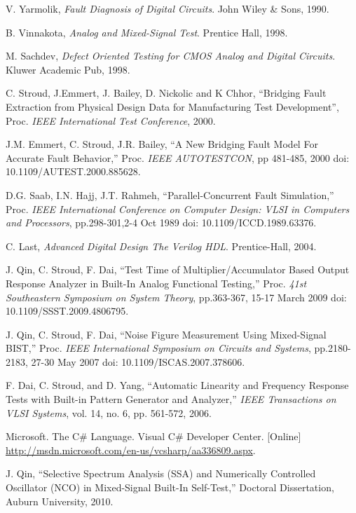 \documentclass[12pt]{report}
\begin{document}
\begin{thebibliography}{99}
 V. Yarmolik, \textit{Fault Diagnosis of Digital Circuits}. John Wiley & Sons, 1990.

 B. Vinnakota, \textit{Analog and Mixed-Signal Test}. Prentice Hall, 1998.

 M. Sachdev, \textit{Defect Oriented Testing for CMOS Analog and Digital Circuits}.  Kluwer Academic Pub, 1998.

 C. Stroud, J.Emmert, J. Bailey, D. Nickolic and K Chhor, ``Bridging Fault Extraction from Physical Design Data for Manufacturing Test Development'', Proc. \textit{IEEE International Test Conference}, 2000.

 J.M. Emmert, C. Stroud, J.R. Bailey, ``A New Bridging Fault Model For Accurate Fault Behavior,'' Proc. \textit{IEEE AUTOTESTCON}, pp 481-485, 2000 doi: 10.1109/AUTEST.2000.885628.

 D.G. Saab, I.N. Hajj, J.T. Rahmeh, ``Parallel-Concurrent Fault Simulation,'' Proc. \textit{IEEE International Conference on Computer Design: VLSI in Computers and Processors}, pp.298-301,2-4 Oct 1989 doi: 10.1109/ICCD.1989.63376.

 C. Last, \textit{Advanced Digital Design The Verilog HDL}.  Prentice-Hall, 2004.

 J. Qin, C. Stroud, F. Dai, ``Test Time of Multiplier/Accumulator Based Output Response Analyzer in Built-In Analog Functional Testing,'' Proc. \textit{41st Southeastern Symposium on System Theory}, pp.363-367, 15-17 March 2009 doi: 10.1109/SSST.2009.4806795.

 J. Qin, C. Stroud, F. Dai, ``Noise Figure Measurement Using Mixed-Signal BIST,'' Proc. \textit{IEEE International Symposium on Circuits and Systems}, pp.2180-2183, 27-30 May 2007 doi: 10.1109/ISCAS.2007.378606.

 F. Dai, C. Stroud, and D. Yang, ``Automatic Linearity and Frequency Response Tests with Built-in Pattern Generator and Analyzer,''  \textit{IEEE Transactions on VLSI Systems}, vol. 14, no. 6, pp. 561-572, 2006.

 Microsoft. The C\# Language. Visual C\# Developer Center. [Online] \url{http://msdn.microsoft.com/en-us/vcsharp/aa336809.aspx}.

 J. Qin, ``Selective Spectrum Analysis (SSA) and Numerically Controlled Oscillator (NCO) in Mixed-Signal Built-In Self-Test,'' Doctoral Dissertation, Auburn University, 2010.


\end{thebibliography}
\end{document}
